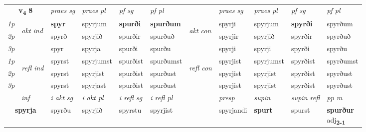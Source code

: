 \noindent
\begin{tabular}{lllllllllll} \toprule
\multicolumn{2}{c}{\textbf{v{\textsubscript{4}}} \Large{\textbf{8}}}  &  \textit{praes sg}  & \textit{praes pl}  &\textit{ pf sg} & \textit{pf pl} &  &  \textit{praes sg}  & \textit{praes pl}  & \textit{pf sg} & \textit{pf pl } \\*
	\cmidrule{3-6} \cmidrule{8-11}
 {\textit{1p}} & \multirow{3}{*}{\begin{turn}{90}\textit{akt ind}\end{turn}} & \textbf{spyr} & spyrjum & \textbf{spurði} & \textbf{spurðum} & \multirow{3}{*}{\begin{turn}{90}\textit{akt con}\end{turn}} &spyrji & spyrjum & \textbf{spyrði} & spyrðum\\*
 {\textit{2p}} &  &  spyrð  & spyrjið & spurðir & spurðuð & & spyrjir & spyrjið & spyrðir & spyrðuð \\*
{\textit{3p}} &  & spyr & spyrja & spurði & spurðu & & spyrji & spyrji& spyrði & spyrðu \\*
\cmidrule{3-6} \cmidrule{8-11}
 {\textit{1p}} & \multirow{3}{*}{\begin{turn}{90}\textit{refl ind}\end{turn}}  & spyrst & spyrjumst & spurðist & spurðumst & \multirow{3}{*}{\begin{turn}{90}\textit{refl con}\end{turn}}  &spyrjist & spyrjumst & spyrðist & spyrðumst \\*
 {\textit{2p}} &  & spyrst & spyrjist & spurðist & spurðust & &spyrjist & spyrjist & spyrðist & spyrðust \\*
 {\textit{3p}}  & & spyrst & spyrjast & spurðist & spurðust & & spyrjist & spyrjist& spyrðist & spyrðust \\*
\cmidrule{3-6} \cmidrule{8-11}

   \multicolumn{2}{c}{\textit{inf}}  & \textit{i akt sg} & \textit{i akt pl} & \textit{i refl sg} & \textit{i refl pl} && \textit{presp} & \textit{supin} & \textit{supin refl} & \textit{pp m} \\*
  \multicolumn{2}{c}{\textbf{spyrja}} & spyrðu  & spyrjið & spyrstu & spyrjist && spyrjandi &  \textbf{spurt} & spurst & \specialcell{\textbf{spurður} \\ adj\textbf{\textsubscript{2-1}}} \\*
\end{tabular}

